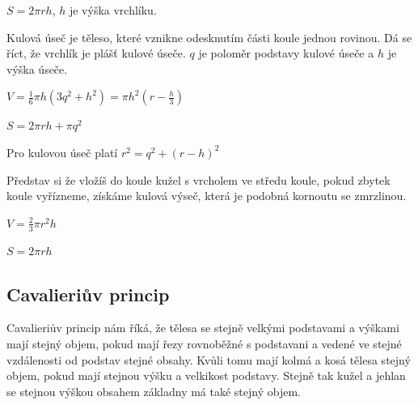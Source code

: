 \documentclass[12pt]{article}
\begin{document}
$S = 2 \pi r h$, $h$ je výška vrchlíku.

Kulová úseč je těleso, které vznikne odesknutím části koule jednou rovinou. Dá se říct, že vrchlík
je plášť kulové úseče. $q$ je poloměr podstavy kulové úseče a $h$ je výška úseče.

$V = \frac{1}{6} \pi h(3 q^2 + h^2) = \pi h^2(r - \frac{h}{3})$

$S = 2\pi r h + \pi q^2$

Pro kulovou úseč platí $r^2 = q^2 + (r - h)^2$

Představ si že vložíš do koule kužel s vrcholem ve středu koule, pokud zbytek koule vyřízneme,
získáme kulová výseč, která je podobná kornoutu se zmrzlinou.

$V = \frac{2}{3} \pi r^2 h$

$S = 2 \pi r h$

\subsection*{Cavalieriův princip}
Cavalieriův princip nám říká, že tělesa se stejně velkými podstavami a výškami mají stejný objem,
pokud mají řezy rovnoběžné s podstavani a vedené ve stejné vzdálenosti od podstav stejné obsahy.
Kvůli tomu mají kolmá a kosá tělesa stejný objem, pokud mají stejnou výšku a velkikost podstavy.
Stejně tak kužel a jehlan se stejnou výškou obsahem základny má také stejný objem.
\end{document}
